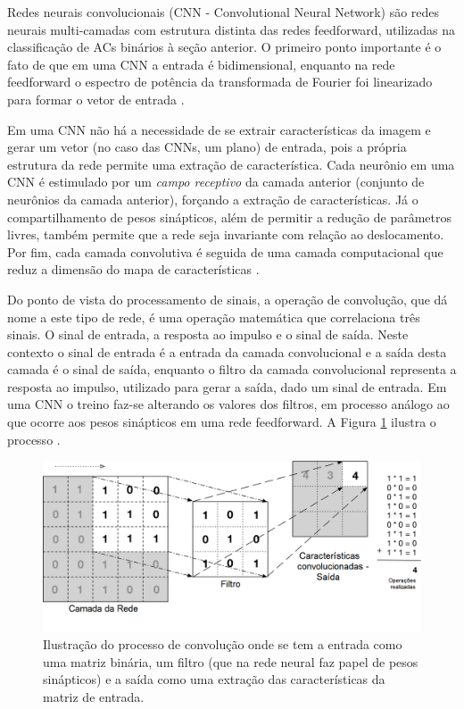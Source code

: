 \documentclass[12pt,a4paper]{report}
\begin{document}
	Redes neurais convolucionais (CNN - Convolutional Neural Network) são redes neurais multi-camadas com estrutura distinta das redes feedforward, utilizadas na classificação de ACs binários à seção anterior. O primeiro ponto importante é o fato de que em uma CNN a entrada é bidimensional, enquanto na rede feedforward o espectro de potência da transformada de Fourier foi linearizado para formar o vetor de entrada \cite{Goodfellow-et-al-2016}.
	
	Em uma CNN não há a necessidade de se extrair características da imagem e gerar um vetor (no caso das CNNs, um plano) de entrada, pois a própria estrutura da rede permite uma extração de característica. Cada neurônio em uma CNN é estimulado por um \textit{campo receptivo} da camada anterior (conjunto de neurônios da camada anterior), forçando a extração de características. Já o compartilhamento de pesos sinápticos, além de permitir a redução de parâmetros livres, também permite que a rede seja invariante com relação ao deslocamento. Por fim, cada camada convolutiva é seguida de uma camada computacional que reduz a dimensão do mapa de características \cite{haykin2009neural}.
	
	Do ponto de vista do processamento de sinais, a operação de convolução, que dá nome a este tipo de rede, é uma operação matemática que correlaciona três sinais. O sinal de entrada, a resposta ao impulso e o sinal de saída. Neste contexto o sinal de entrada é a entrada da camada convolucional e a saída desta camada é o sinal de saída, enquanto o filtro da camada convolucional representa a resposta ao impulso, utilizado para gerar a saída, dado um sinal de entrada. Em uma CNN o treino faz-se alterando os valores dos filtros, em processo análogo ao que ocorre aos pesos sinápticos em uma rede feedforward. A Figura \ref{fig:ConvolutionalOperation} ilustra o processo \cite{Haykin:1998:SS:552094}.
	
	\begin{figure}[H]
		\centering
		\includegraphics[scale=1.0]{./img/convolucao_matriz_binaria.png}
		\caption{Ilustração do processo de convolução onde se tem a entrada como uma matriz binária, um filtro (que na rede neural faz  papel de pesos sinápticos) e a saída como uma extração das características da matriz de entrada.}
		\label{fig:ConvolutionalOperation}
	\end{figure}
	
\end{document}
